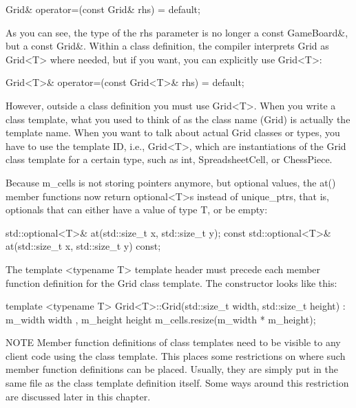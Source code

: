 \begin{cpp}
Grid& operator=(const Grid& rhs) = default;
\end{cpp}

As you can see, the type of the rhs parameter is no longer a const GameBoard\&, but a const Grid\&. Within a class definition, the compiler interprets Grid as Grid<T> where needed, but if you want, you can explicitly use Grid<T>:

\begin{cpp}
Grid<T>& operator=(const Grid<T>& rhs) = default;
\end{cpp}

However, outside a class definition you must use Grid<T>. When you write a class template, what you used to think of as the class name (Grid) is actually the template name. When you want to talk about actual Grid classes or types, you have to use the template ID, i.e., Grid<T>, which are instantiations of the Grid class template for a certain type, such as int, SpreadsheetCell, or ChessPiece.

Because m\_cells is not storing pointers anymore, but optional values, the at() member functions now return optional<T>s instead of unique\_ptrs, that is, optionals that can either have a value of type T, or be empty:

\begin{cpp}
std::optional<T>& at(std::size_t x, std::size_t y);
const std::optional<T>& at(std::size_t x, std::size_t y) const;
\end{cpp}


The template <typename T> template header must precede each member function definition for the Grid class template. The constructor looks like this:

\begin{cpp}
template <typename T>
Grid<T>::Grid(std::size_t width, std::size_t height)
    : m_width { width }, m_height { height }
{
    m_cells.resize(m_width * m_height);
}
\end{cpp}

\begin{myNotic}{NOTE}
Member function definitions of class templates need to be visible to any client code using the class template. This places some restrictions on where such member function definitions can be placed. Usually, they are simply put in the same file as the class template definition itself. Some ways around this restriction are discussed later in this chapter.
\end{myNotic}

